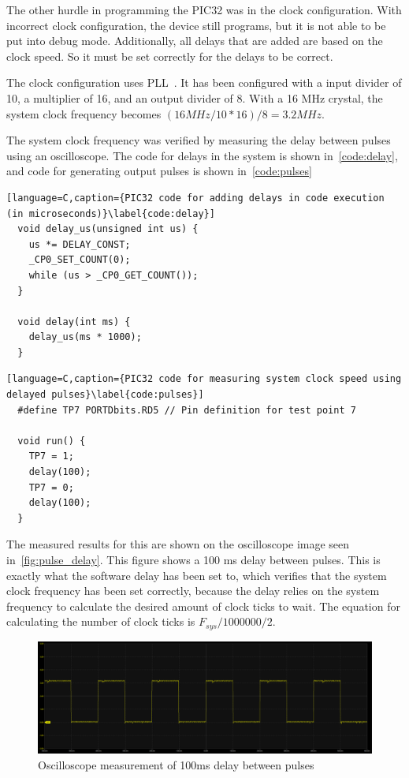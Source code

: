 The other hurdle in programming the PIC32 was in the clock configuration.
With incorrect clock configuration, the device still programs, but it is not able to be put into debug mode.
Additionally, all delays that are added are based on the clock speed.
So it must be set correctly for the delays to be correct.

The clock configuration uses PLL~\cite{Maji:2016}.
It has been configured with a input divider of 10, a multiplier of 16, and an output divider of 8.
With a 16 MHz crystal, the system clock frequency becomes \((16 MHz / 10 * 16) / 8 = 3.2 MHz\).

The system clock frequency was verified by measuring the delay between pulses using an oscilloscope.
The code for delays in the system is shown in~\autoref{code:delay}, and code for generating output pulses is shown in~\autoref{code:pulses}

\begin{lstlisting}[language=C,caption={PIC32 code for adding delays in code execution (in microseconds)}\label{code:delay}]
  void delay_us(unsigned int us) {
    us *= DELAY_CONST;
    _CP0_SET_COUNT(0);
    while (us > _CP0_GET_COUNT());
  }

  void delay(int ms) {
    delay_us(ms * 1000);
  }
\end{lstlisting}

\begin{lstlisting}[language=C,caption={PIC32 code for measuring system clock speed using delayed pulses}\label{code:pulses}]
  #define TP7 PORTDbits.RD5 // Pin definition for test point 7

  void run() {
    TP7 = 1;
    delay(100);
    TP7 = 0;
    delay(100);
  }
\end{lstlisting}

The measured results for this are shown on the oscilloscope image seen in~\autoref{fig:pulse_delay}.
This figure shows a 100 ms delay between pulses.
This is exactly what the software delay has been set to, which verifies that the system clock frequency has been set correctly,
because the delay relies on the system frequency to calculate the desired amount of clock ticks to wait.
The equation for calculating the number of clock ticks is \(F_{sys} / 1000000 / 2\).

\begin{figure}[!ht]
  \caption{Oscilloscope measurement of 100ms delay between pulses}\label{fig:pulse_delay}
  \centering
  \includegraphics[width=1\columnwidth]{chapters/development/results/DELAY}
\end{figure}


